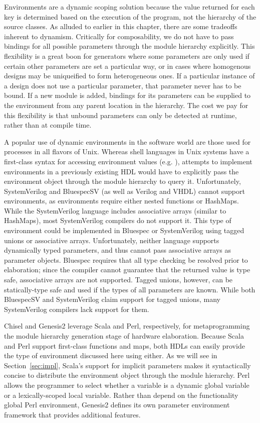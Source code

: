 Environments are a dynamic scoping solution because the value returned for each key is determined based on the execution of the program,
not the hierarchy of the source classes.
As alluded to earlier in this chapter, there are some tradeoffs inherent to dynamism.
Critically for composability, we do not have to pass bindings for all possible parameters through the module hierarchy explicitly.
This flexibility is a great boon for generators where some parameters are only used if certain other parameters are set a particular way,
or in cases where homogenous designs may be uniqueified to form heterogeneous ones.
If a particular instance of a design does not use a particular parameter, that parameter never has to be bound.
If a new module is added, bindings for its parameters can be supplied to the environment from any parent location in the hierarchy.
The cost we pay for this flexibility is that unbound parameters can only be detected at runtime, rather than at compile time.

A popular use of dynamic environments in the software world are those used for processes in all flavors of Unix.
Whereas shell languages in Unix systems have a first-class syntax for accessing environment values (e.g. ),
attempts to implement environments in a previously existing HDL would have to explicitly pass the environment object through the module hierarchy to query it.
Unfortunately, SystemVerilog and BluespecSV (as well as Verilog and VHDL) cannot support environments, as environments require either nested functions or HashMaps.
While the SystemVerilog language includes associative arrays (similar to HashMaps), most SystemVerilog compilers do not support it.
This type of environment could be implemented in Bluespec or SystemVerilog using tagged unions or associative arrays.
Unfortunately, neither language supports dynamically typed parameters, and thus cannot pass associative arrays as parameter objects.
Bluespec requires that all type checking be resolved prior to elaboration; since the compiler cannot guarantee that the returned value is type safe, associative arrays are not supported. 
Tagged unions, however, can be statically-type safe and used if the types of all parameters are known.
While both BluespecSV and SystemVerilog claim support for tagged unions, many SystemVerilog compilers lack support for them.

Chisel and Genesis2 leverage Scala and Perl, respectively, for metaprogramming the module hierarchy generation stage of hardware elaboration.
Because Scala and Perl support first-class functions and maps, both HDLs can easily provide the type of environment discussed here using either.
As we will see in Section~\ref{sec:impl}, Scala's support for implicit parameters makes it syntactically concise to distribute
the environment object through the module hierarchy.
Perl allows the programmer to select whether a variable is a dynamic global variable or a lexically-scoped local variable.
Rather than depend on the functionality global Perl environment, Genesis2 defines its own parameter environment framework that provides additional features.


